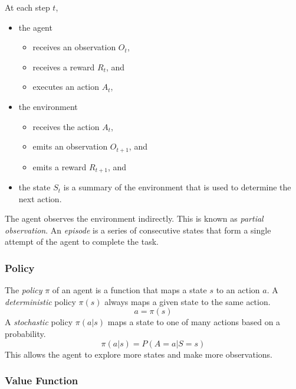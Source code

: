 At each step \( t \),
\begin{itemize}
  \item the agent
  \begin{itemize}
    \item receives an observation \( O_{t} \),
    \item receives a reward \( R_{t} \), and
    \item executes an action \( A_{t} \),
  \end{itemize}
  \item the environment
  \begin{itemize}
    \item receives the action \( A_{t} \),
    \item emits an observation \( O_{t+1} \), and
    \item emits a reward \( R_{t+1} \), and
  \end{itemize}
  \item the state \( S_{t} \) is a summary of the environment that is used to determine the next action.
\end{itemize}

The agent observes the environment indirectly.
This is known as \emph{partial observation}.
An \emph{episode} is a series of consecutive states that form a single attempt of the agent to complete the task.

\subsubsection{Policy}

The \emph{policy} \( \pi \) of an agent is a function that maps a state \( s \) to an action \( a \).
A \emph{deterministic} policy \( \pi\!\left(s\right) \) always maps a given state to the same action.
\begin{equation*}
  a = \pi\!\left(s\right)
\end{equation*}
A \emph{stochastic} policy \( \pi\!\left(a \vert s \right) \) maps a state to one of many actions based on a probability.
\begin{equation*}
  \pi\!\left(a \vert s \right) = P\!\left( A = a \vert S = s \right)
\end{equation*}
This allows the agent to explore more states and make more observations.

\subsubsection{Value Function}

